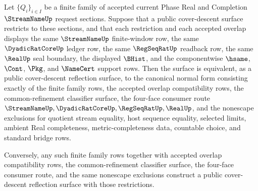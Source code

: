 \begin{theorem}
\label{thm:streamname-finite-section-cover-descent-normal-form}
Let $\{Q_i\}_{i \in I}$ be a finite family of accepted current Phase Real and
Completion $\StreamNameUp$ request sections. Suppose that a public
cover-descent surface restricts to these sections, and that each restriction
and each accepted overlap displays the same $\StreamNameUp$ finite-window row,
the same $\DyadicRatCoreUp$ ledger row, the same $\RegSeqRatUp$ readback row,
the same $\RealUp$ seal boundary, the displayed $\BHist$, and the
componentwise $\hsame$, $\Cont$, $\Pkg$, and $\NameCert$ support rows. Then the
surface is equivalent, as a public cover-descent reflection surface, to the
canonical normal form consisting exactly of the finite family rows, the
accepted overlap compatibility rows, the common-refinement classifier surface,
the four-face consumer route
$\StreamNameUp,\DyadicRatCoreUp,\RegSeqRatUp,\RealUp$, and the nonescape
exclusions for quotient stream equality, host sequence equality, selected
limits, ambient Real completeness, metric-completeness data, countable choice,
and standard bridge rows.

Conversely, any such finite family rows together with accepted overlap
compatibility rows, the common-refinement classifier surface, the four-face
consumer route, and the same nonescape exclusions construct a public
cover-descent reflection surface with those restrictions.
\end{theorem}
